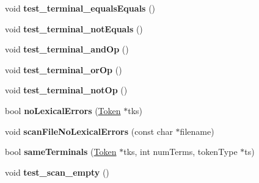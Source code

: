 \begin{DoxyCompactItemize}
\item 
\hypertarget{class_scanner_test_suite_a4a15e77f16d68048c1a86ae078be2833}{}void {\bfseries test\+\_\+terminal\+\_\+equals\+Equals} ()\label{class_scanner_test_suite_a4a15e77f16d68048c1a86ae078be2833}

\item 
\hypertarget{class_scanner_test_suite_ac5ef06e31af6d84f45562beeae37cc0c}{}void {\bfseries test\+\_\+terminal\+\_\+not\+Equals} ()\label{class_scanner_test_suite_ac5ef06e31af6d84f45562beeae37cc0c}

\item 
\hypertarget{class_scanner_test_suite_ac59bf938e379950259fe3dcd7b49fc8e}{}void {\bfseries test\+\_\+terminal\+\_\+and\+Op} ()\label{class_scanner_test_suite_ac59bf938e379950259fe3dcd7b49fc8e}

\item 
\hypertarget{class_scanner_test_suite_a419f8b30aa9afc64a53dddac255429c2}{}void {\bfseries test\+\_\+terminal\+\_\+or\+Op} ()\label{class_scanner_test_suite_a419f8b30aa9afc64a53dddac255429c2}

\item 
\hypertarget{class_scanner_test_suite_a188e5bdd91f633e072957fd4e4944522}{}void {\bfseries test\+\_\+terminal\+\_\+not\+Op} ()\label{class_scanner_test_suite_a188e5bdd91f633e072957fd4e4944522}

\item 
\hypertarget{class_scanner_test_suite_a681db679ec2418f862f478fa7678942b}{}bool {\bfseries no\+Lexical\+Errors} (\hyperlink{class_token}{Token} $\ast$tks)\label{class_scanner_test_suite_a681db679ec2418f862f478fa7678942b}

\item 
\hypertarget{class_scanner_test_suite_a01dc6065a02127accc049627ae234129}{}void {\bfseries scan\+File\+No\+Lexical\+Errors} (const char $\ast$filename)\label{class_scanner_test_suite_a01dc6065a02127accc049627ae234129}

\item 
\hypertarget{class_scanner_test_suite_a97c50725866b3a5b36c36488053a59bc}{}bool {\bfseries same\+Terminals} (\hyperlink{class_token}{Token} $\ast$tks, int num\+Terms, token\+Type $\ast$ts)\label{class_scanner_test_suite_a97c50725866b3a5b36c36488053a59bc}

\item 
\hypertarget{class_scanner_test_suite_a01beafb44a33f4d80baf9a4208919c07}{}void {\bfseries test\+\_\+scan\+\_\+empty} ()\label{class_scanner_test_suite_a01beafb44a33f4d80baf9a4208919c07}


\end{DoxyCompactItemize}

